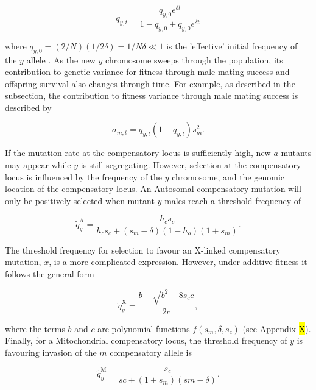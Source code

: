 \documentclass{article}
\begin{document}
\begin{equation} \label{eq:qyt}
	q_{y,t} = \frac{q_{y,0} e^{\delta t}} {1 - q_{y,0} + q_{y,0} e^{\delta t}}
\end{equation} 

\noindent where $q_{y,0} = (2/N)(1/2 \delta) = 1/N \delta \ll 1$ is the 'effective' initial frequency of the $y$ allele \citep{MaynardSmith1976,Ewens2004}. As the new $y$ chromosome sweeps through the population, its contribution to genetic variance for fitness through male mating success and offspring survival also changes through time. For example, as described in the  subsection, the contribution to fitness variance through male mating success is described by 

\begin{equation} \label{eq:sigma-qyt}
	\sigma_{m,t} = q_{y,t}(1 - q_{y,t})s_{m}^{2}.
\end{equation} 

\noindent If the mutation rate at the compensatory locus is sufficiently high, new $a$ mutants may appear while $y$ is still segregating. However, selection at the compensatory locus is influenced by the frequency of the $y$ chromosome, and the genomic location of the compensatory locus. An Autosomal compensatory mutation will only be positively selected when mutant $y$ males reach a threshold frequency of

\begin{equation} \label{eq:qTildeAuto} 
	\tilde{q}_y^{\text{A}} = \frac{h_c s_c} {h_c s_c + (s_m - \delta)(1 - h_o)(1+s_m)}.
\end{equation}

\noindent The threshold frequency for selection to favour an X-linked compensatory mutation, $x$, is a more complicated expression. However, under additive fitness it follows the general form

\begin{equation} \label{eq:qTildeX} 
	\tilde{q}_y^{\text{X}} = \frac{b - \sqrt{b^2 - 8 s_c c}} {2 c},
\end{equation}

\noindent where the terms $b$ and $c$ are polynomial functions $f(s_m,\delta,s_c)$ (see Appendix \hl{X}). Finally, for a Mitochondrial compensatory locus, the threshold frequency of $y$ is favouring invasion of the $m$ compensatory allele is

\begin{equation} \label{eq:qTildeM} 
	\tilde{q}_y^{\text{M}} = \frac{s_c} {sc + (1 + s_m) (sm - \delta)}.
\end{equation}
\end{document}
